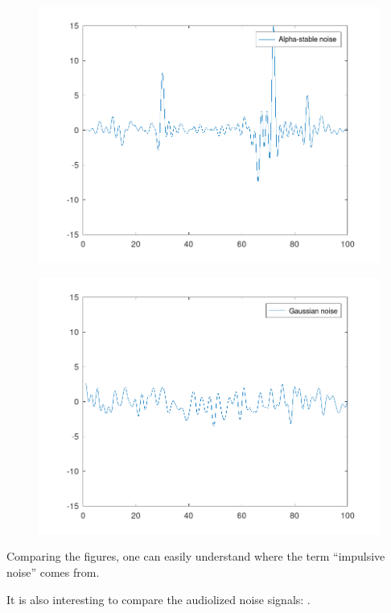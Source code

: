 \documentclass{article}
\begin{document}
\begin{figure}
  \includegraphics[width=\linewidth]{alphastablenoise.png}
\end{figure}


\begin{figure}
  \includegraphics[width=\linewidth]{gaussiannoise.png}
\end{figure}

Comparing the figures, one can easily understand where the term ``impulsive noise'' comes from.


It is also interesting to compare the audiolized noise signals:
.
\end{document}
